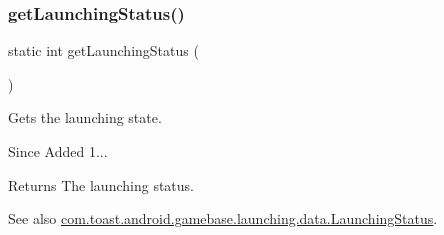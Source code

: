 \subsubsection{\texorpdfstring{get\+Launching\+Status()}{getLaunchingStatus()}}
{\footnotesize\ttfamily static int get\+Launching\+Status (\begin{DoxyParamCaption}{ }\end{DoxyParamCaption})\hspace{0.3cm}{\ttfamily [static]}}



Gets the launching state. 

\begin{DoxySince}{Since}
Added 1... 
\end{DoxySince}
\begin{DoxyReturn}{Returns}
The launching status. 
\end{DoxyReturn}
\begin{DoxySeeAlso}{See also}
\hyperlink{classcom_1_1toast_1_1android_1_1gamebase_1_1launching_1_1data_1_1_launching_status}{com.\+toast.\+android.\+gamebase.\+launching.\+data.\+Launching\+Status}. 
\end{DoxySeeAlso}
